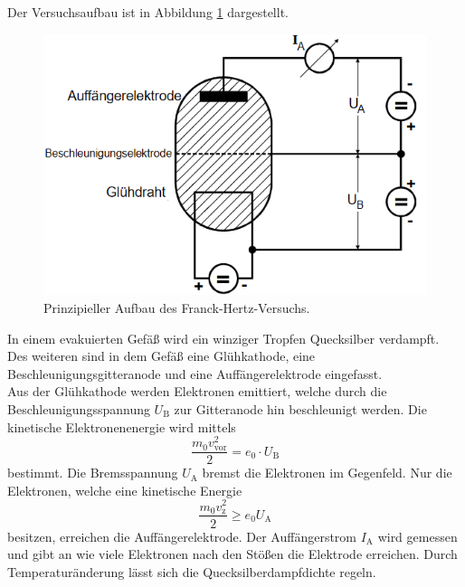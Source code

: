 Der Versuchsaufbau ist in Abbildung \ref{fig:auft} dargestellt.
\begin{figure}
    \centering
    \caption{Prinzipieller Aufbau des Franck-Hertz-Versuchs.\cite{v601}}
    \label{fig:auft}
    \includegraphics[width = 0.6 \textwidth]{pics/auft.png}
\end{figure}
In einem evakuierten Gefäß wird ein winziger Tropfen Quecksilber verdampft. Des weiteren sind in dem Gefäß eine Glühkathode, eine Beschleunigungsgitteranode und
eine Auffängerelektrode eingefasst. 
\\
Aus der Glühkathode werden Elektronen emittiert, welche durch die Beschleunigungsspannung $U_\text{B}$ zur Gitteranode hin beschleunigt werden.
Die kinetische Elektronenenergie wird mittels
\begin{equation}
    \frac{m_0 v_\text{vor}^2}{2} = e_0 \cdot U_\text{B}
\end{equation}
bestimmt. Die Bremsspannung $U_\text{A}$ bremst die Elektronen im Gegenfeld.
Nur die Elektronen, welche eine kinetische Energie
\begin{equation}
    \frac{m_0 v_\text{z}^2}{2} \geq e_0 U_\text{A}
\end{equation}
besitzen, erreichen die Auffängerelektrode. Der Auffängerstrom $I_\text{A}$ wird gemessen und gibt an wie viele Elektronen nach den Stößen die Elektrode erreichen.
Durch Temperaturänderung lässt sich die Quecksilberdampfdichte regeln.